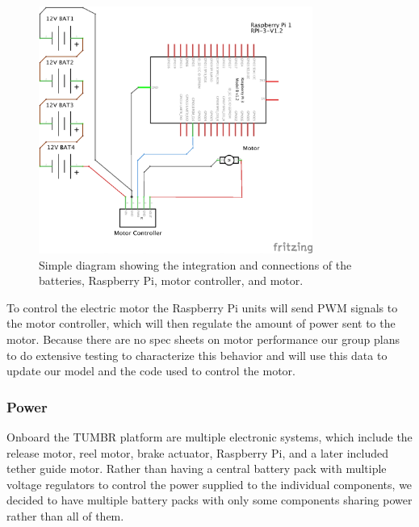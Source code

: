\begin{figure}[ht]
  \centering
  \includegraphics[width=0.8\textwidth]{Controls/rpi_controller_motor_schem.png}
  \caption{\label{fig:rpi_controller_motor_schem}Simple diagram showing the integration and connections of the batteries, Raspberry Pi, motor controller, and motor.}
\end{figure}

\indent\indent To control the electric motor the Raspberry Pi units will send PWM signals to the motor controller, which will then regulate the amount of power sent to the motor. Because there are no spec sheets on motor performance our group plans to do extensive testing to characterize this behavior and will use this data to update our model and the code used to control the motor.

\subsubsection{Power}

\indent\indent Onboard the TUMBR platform are multiple electronic systems, which include the release motor, reel motor, brake actuator, Raspberry Pi, and a later included tether guide motor. Rather than having a central battery pack with multiple voltage regulators to control the power supplied to the individual components, we decided to have multiple battery packs with only some components sharing power rather than all of them. 

